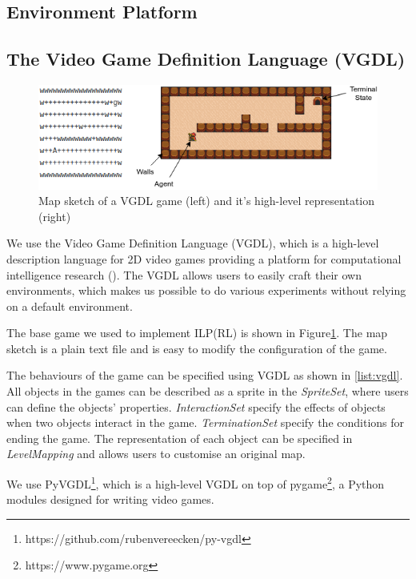 \subsection{Environment Platform}
\subsection{The Video Game Definition Language (VGDL)}

\begin{figure}[!ht!b]
\centering
\includegraphics[width=1\textwidth]{./figures/env_sample}
\caption{Map sketch of a VGDL game (left) and it's high-level representation (right)} 
\label{VGDL_sample}
\end{figure}

We use the Video Game Definition Language (VGDL), which is a high-level description language for 2D video games providing a platform for computational intelligence research (\cite{Schaul2013}).
The VGDL allows users to easily craft their own environments, 
which makes us possible to do various experiments without relying on a default environment.

The base game we used to implement ILP(RL) is shown in Figure\ref{VGDL_sample}.
The map sketch is a plain text file and is easy to modify the configuration of the game.



The behaviours of the game can be specified using VGDL as shown in \ref{list:vgdl}. 
All objects in the games can be described as a sprite in the \textit{SpriteSet}, where users can define the objects' properties.
\textit{InteractionSet} specify the effects of objects when two objects interact in the game.
\textit{TerminationSet} specify the conditions for ending the game.
The representation of each object can be specified in \textit{LevelMapping} and allows users to customise an original map.

We use PyVGDL\footnote{https://github.com/rubenvereecken/py-vgdl}, which is a high-level VGDL on top of pygame\footnote{https://www.pygame.org}, 
a Python modules designed for writing video games.


